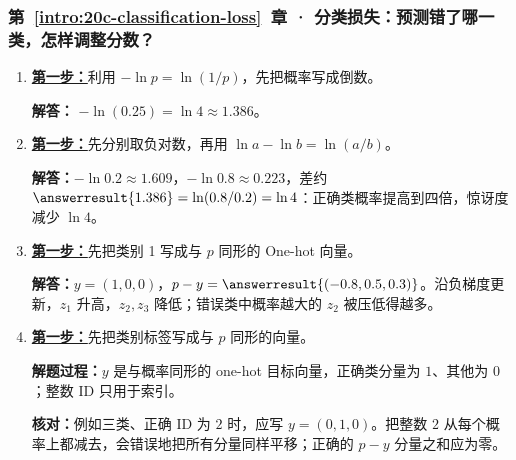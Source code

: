 \subsubsection*{第~\ref*{intro:20c-classification-loss}~章 · 分类损失：预测错了哪一类，怎样调整分数？}
\begin{enumerate}[label={},leftmargin=4.8em,itemsep=4pt]
\item[\textbf{C-043.}] \leavevmode{}\label{solution:C-043}\label{solution:single-token-cross-entropy}\hyperref[exercise:single-token-cross-entropy]{\textbf{第一步：}}利用 $-\ln p=\ln(1/p)$，先把概率写成倒数。\par\nobreak
\textbf{解答：} $-\ln(0.25)=\ln4\approx1.386$。
\item[\textbf{C-044.}] \leavevmode{}\label{solution:C-044}\label{solution:probability-loss-ratio}\hyperref[exercise:probability-loss-ratio]{\textbf{第一步：}}先分别取负对数，再用 $\ln a-\ln b=\ln(a/b)$。\par\nobreak
\textbf{解答：}$-\ln0.2\approx1.609$，$-\ln0.8\approx0.223$，差约 $\answerresult{1.386}=\ln(0.8/0.2)=\ln4$：正确类概率提高到四倍，惊讶度减少 $\ln4$。
\item[\textbf{C-045.}] \leavevmode{}\label{solution:C-045}\label{solution:softmax-logit-gradient}\hyperref[exercise:softmax-logit-gradient]{\textbf{第一步：}}先把类别 1 写成与 $p$ 同形的 One-hot 向量。\par\nobreak
\textbf{解答：}$y=(1,0,0)$，$p-y=\answerresult{(-0.8,0.5,0.3)}$。沿负梯度更新，$z_1$ 升高，$z_2,z_3$ 降低；错误类中概率越大的 $z_2$ 被压低得越多。
\item[\textbf{C-046.}] \leavevmode{}\label{solution:C-046}\label{solution:one-hot-gradient-target}\hyperref[exercise:one-hot-gradient-target]{\textbf{第一步：}}先把类别标签写成与 $p$ 同形的向量。\par\nobreak\textbf{解题过程：}$y$ 是与概率同形的 one-hot 目标向量，正确类分量为 $1$、其他为 $0$；整数 ID 只用于索引。\par\textbf{核对：}例如三类、正确 ID 为 $2$ 时，应写 $y=(0,1,0)$。把整数 $2$ 从每个概率上都减去，会错误地把所有分量同样平移；正确的 $p-y$ 分量之和应为零。
\end{enumerate}
